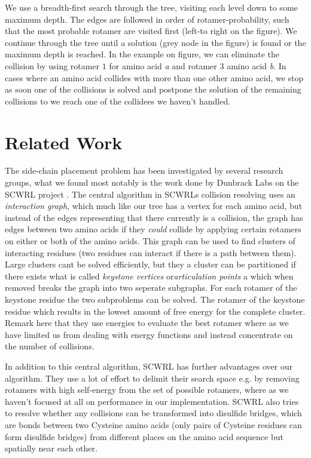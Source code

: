 We use a breadth-first search through the tree, visiting each level
down to some maximum depth. The edges are followed in order of
rotamer-probability, such that the most probable rotamer are visited
first (left-to right on the figure). We continue through the tree
until a solution (grey node in the figure) is found or the maximum
depth is reached. In the example on figure, we can eliminate the
collision by using rotamer $1$ for amino acid \textit{a} and rotamer
$3$ amino acid \textit{b}. In cases where an amino acid collides with
more than one other amino acid, we stop as soon one of the collisions
is solved and postpone the solution of the remaining collisions to we
reach one of the collidees we haven't handled.


\section{Related Work}
The side-chain placement problem has been investigated by several
research groups, what we found most notably is the work done by
Dunbrack Labs on the SCWRL project \cite{canutescu2003graph,
  krivov2009improved}. The central algorithm in SCWRLs collision
resolving uses an \textit{interaction graph}, which much like our tree
has a vertex for each amino acid, but instead of the edges
representing that there currently is a collision, the graph has edges
between two amino acids if they \textit{could} collide by applying
certain rotamers on either or both of the amino acids. This graph can
be used to find clusters of interacting residues (two residues can
interact if there is a path between them). Large clusters cant be
solved efficiently, but they a cluster can be partitioned if there
exists what is called \textit{keystone vertices}
or\textit{articulation points} a which when removed breaks the graph
into two seperate subgraphs. For each rotamer of the keystone residue
the two subproblems can be solved. The rotamer of the keystone residue
which results in the lowest amount of free energy for the complete
cluster. Remark here that they use energies to evaluate the best
rotamer where as we have limited us from dealing with energy
functions and instead concentrate on the number of collisions.

In addition to this central algorithm, SCWRL has further advantages
over our algorithm. They use a lot of effort to delimit their search
space e.g. by removing rotamers with high self-energy from the set of
possible rotamers, where as we haven't focused at all on performance
in our implementation. SCWRL also tries to resolve whether any
collisions can be transformed into disulfide bridges, which are bonds
between two Cysteine amino acids (only pairs of Cysteine residues can form
disulfide bridges) from different places on the amino acid sequence
but spatially near each other.


